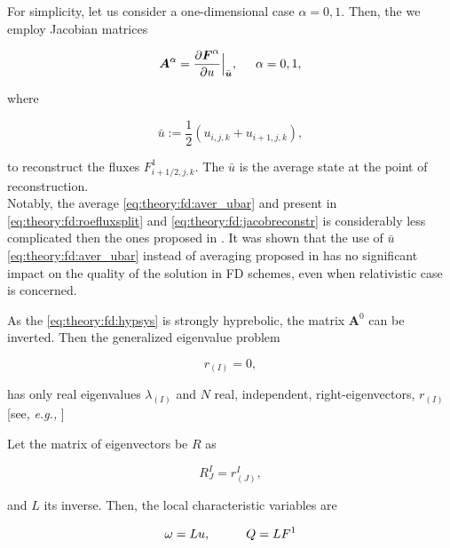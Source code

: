 For simplicity, let us consider a one-dimensional case $\alpha={0,1}$. 
Then, the we employ Jacobian matrices

\begin{equation}
\boldsymbol{A}^{\alpha} = \frac{\partial \boldsymbol{F}^{\alpha}}{\partial u}\Big|_{\bar{\boldsymbol{u}}}, \hspace{5mm} \alpha = 0,1,
\label{eq:theory:fd:jacobreconstr}
\end{equation}

where 

\begin{equation}
\bar{u} := \frac{1}{2}(u_{i,j,k} + u_{i+1,j,k}),
\label{eq:theory:fd:aver_ubar}
\end{equation}

to reconstruct the fluxes $F^1 _{i+1/2, j, k}$. 
The $\bar{u}$ is the average state at the point of reconstruction. \\

Notably, the average \ref{eq:theory:fd:aver_ubar} and present in \ref{eq:theory:fd:roefluxsplit} and \ref{eq:theory:fd:jacobreconstr} is considerably less complicated then the ones proposed in \cite{Roe:1981}. 
It was shown that the use of $\bar{u}$ \ref{eq:theory:fd:aver_ubar} instead of averaging proposed in \cite{Roe:1981} has no significant impact on the quality of the solution in FD schemes, even when relativistic case is concerned. 

As the \ref{eq:theory:fd:hypsys} is strongly hyprebolic, the matrix $\boldsymbol{A}^0$ can be inverted. 
Then the generalized eigenvalue problem 

\begin{equation}
[\boldsymbol{A}^1 - \lambda_{(1)}\boldsymbol{A}^0]r_{(I)} = 0,
\end{equation}

has only real eigenvalues $\lambda_{(I)}$ and $N$ real, independent, right-eigenvectors, $r_{(I)}$ [see, \textit{e.g.,} \cite{Anile:1990}]

Let the matrix of eigenvectors be $R$ as 

\begin{equation}
R_{J}^{I} = r^{I}_{(J)},
\end{equation}

and $L$ its inverse. 
Then, the local characteristic variables are 

\begin{equation}
\omega = Lu, \hspace{10mm} Q = LF^1
\end{equation}

